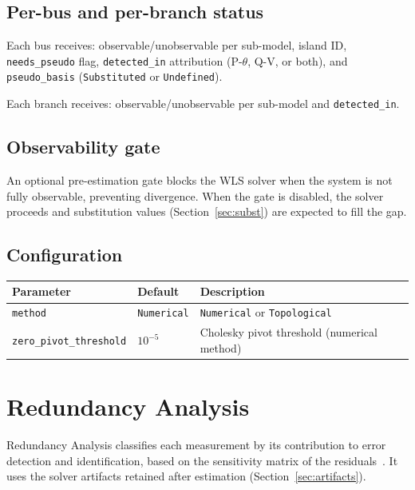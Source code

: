 \documentclass[11pt,a4paper]{article}
\begin{document}
\subsection{Per-bus and per-branch status}

Each bus receives: observable/unobservable per sub-model, island ID,
\texttt{needs\_pseudo} flag, \texttt{detected\_in} attribution (P-$\theta$,
Q-V, or both), and \texttt{pseudo\_basis} (\texttt{Substituted} or
\texttt{Undefined}).

Each branch receives: observable/unobservable per sub-model and
\texttt{detected\_in}.

\subsection{Observability gate}

An optional pre-estimation gate blocks the WLS solver when the system is
not fully observable, preventing divergence.  When the gate is disabled,
the solver proceeds and substitution values (Section~\ref{sec:subst}) are
expected to fill the gap.

\subsection{Configuration}

\begin{center}
\small
\begin{tabular}{llp{55mm}}
  \toprule
  \textbf{Parameter} & \textbf{Default} & \textbf{Description} \\
  \midrule
  \texttt{method}                & \texttt{Numerical}
    & \texttt{Numerical} or \texttt{Topological} \\
  \texttt{zero\_pivot\_threshold} & $10^{-5}$
    & Cholesky pivot threshold (numerical method) \\
  \bottomrule
\end{tabular}
\end{center}



\section{Redundancy Analysis}\label{sec:red}

Redundancy Analysis classifies each measurement by its contribution to
error detection and identification, based on the sensitivity matrix of the
residuals~\cite{handschin1990}.  It uses the solver artifacts retained
after estimation (Section~\ref{sec:artifacts}).
\end{document}

